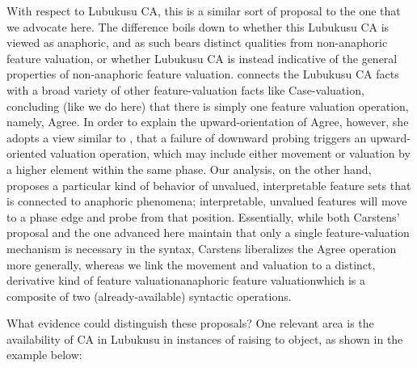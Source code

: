 \documentclass[output=paper
,modfonts
,nonflat
]{langsci/langscibook}
\begin{document}
With respect to Lubukusu CA, this is a similar sort of proposal to the one that we advocate here. The difference boils down to whether this Lubukusu CA is viewed as anaphoric, and as such bears distinct qualities from non-anaphoric feature valuation, or whether Lubukusu CA is instead indicative of the general properties of non-anaphoric feature valuation. \citet{Carstens:2016} connects the Lubukusu CA facts with a broad variety of other feature-valuation facts like Case-valuation, concluding (like we do here) that there is simply one feature valuation operation, namely, Agree.  In order to explain the upward-orientation of Agree, however, she adopts a view similar to \citet{Bejar:2009}, that a failure of downward probing triggers an upward-oriented valuation operation, which may include either movement or valuation by a higher element within the same phase. Our analysis, on the other hand, proposes a particular kind of behavior of unvalued, interpretable feature sets that is connected to anaphoric phenomena; interpretable, unvalued features will move to a phase edge and probe from that position. Essentially, while both Carstens’ proposal and the one advanced here maintain that only a single feature-valuation mechanism is necessary in the syntax, Carstens liberalizes the Agree operation more generally, whereas we link the movement and valuation to a distinct, derivative kind of feature valuation\textemdash anaphoric feature valuation\textemdash which is a composite of two (already-available) syntactic operations.

What evidence could distinguish these proposals? One relevant area is the availability of CA in Lubukusu in instances of raising to object, as shown in the example below: 
\end{document}
